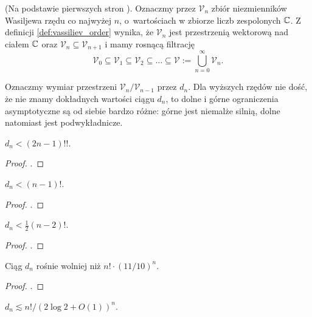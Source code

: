 (Na podstawie pierwszych stron \cite{chmutov12}).
Oznaczmy przez $\mathcal V_n$ zbiór niezmienników Wasiljewa rzędu co najwyżej $n$, o~wartościach w zbiorze liczb zespolonych $\mathbb C$.
Z definicji \ref{def:vassiliev_order} wynika, że $\mathcal V_n$ jest przestrzenią wektorową nad ciałem $\mathbb C$ oraz $\mathcal V_n \subseteq \mathcal V_{n+1}$ i mamy rosnącą filtrację
\begin{equation}
    \mathcal V_0 \subseteq \mathcal V_1 \subseteq \mathcal V_2 \subseteq \ldots \subseteq \mathcal V := \bigcup_{n=0}^\infty \mathcal V_n.
\end{equation}

Oznaczmy wymiar przestrzeni $\mathcal V_n / \mathcal V_{n-1}$ przez $d_n$.
Dla wyższych rzędów nie dość, że nie znamy dokładnych wartości ciągu $d_n$, to dolne i górne ograniczenia asymptotyczne są od siebie bardzo różne: górne jest niemalże silnią, dolne natomiast jest podwykładnicze.

\begin{proposition}
    $d_n < (2n-1)!!$.
\end{proposition}

\begin{proof}
    \cite{duzhin94}.
\end{proof}

\begin{proposition}
    $d_n < (n-1)!$.
\end{proposition}

\begin{proof}
    \cite{chmutovduzhin94}.
\end{proof}

\begin{proposition}
    $d_n < \frac 12 (n-2)!$.
\end{proposition}

\begin{proof}
    \cite{ng98}.
\end{proof}

\begin{proposition}
    Ciąg $d_n$ rośnie wolniej niż $n! \cdot (11/10)^n$.
\end{proposition}

\begin{proof}
    \cite{stoimenow98}.
\end{proof}

\begin{proposition}
    $d_n \lesssim n! / (2 \log 2 + O(1))^n$.
\end{proposition}

